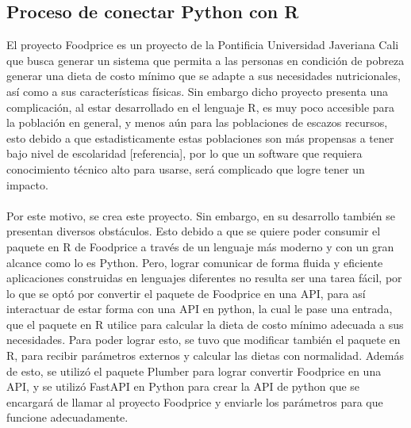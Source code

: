 \subsection{Proceso de conectar Python con R} 
\noindent El proyecto Foodprice es un proyecto de la Pontificia Universidad Javeriana Cali que busca generar un sistema que permita a las personas en condici\'on de pobreza generar una dieta de costo m\'inimo que se adapte a sus necesidades nutricionales, as\'i como a sus caracter\'isticas f\'isicas. Sin embargo dicho proyecto presenta una complicaci\'on, al estar desarrollado en el lenguaje R, es muy poco accesible para la poblaci\'on en general, y menos a\'un para las poblaciones de escazos recursos, esto debido a que estadisticamente estas poblaciones son m\'as propensas a tener bajo nivel de escolaridad [referencia], por lo que un software que requiera conocimiento t\'ecnico alto para usarse, ser\'a complicado que logre tener un impacto.
\\
\\
Por este motivo, se crea este proyecto. Sin embargo, en su desarrollo tambi\'en se presentan diversos obst\'aculos. Esto debido a que se quiere poder consumir el paquete en R de Foodprice a trav\'es de un lenguaje m\'as moderno y con un gran alcance como lo es Python. Pero, lograr comunicar de forma fluida y eficiente aplicaciones construidas en lenguajes diferentes no resulta ser una tarea f\'acil, por lo que se opt\'o por convertir el paquete de Foodprice en una API, para as\'i interactuar de estar forma con una API en python, la cual le pase una entrada, que el paquete en R utilice para calcular la dieta de costo m\'inimo adecuada a sus necesidades. Para poder lograr esto, se tuvo que modificar tambi\'en el paquete en R, para recibir par\'ametros externos y calcular las dietas con normalidad. Adem\'as de esto, se utiliz\'o el paquete Plumber para lograr convertir Foodprice en una API, y se utiliz\'o FastAPI en Python para crear la API de python que se encargar\'a de llamar al proyecto Foodprice y enviarle los par\'ametros para que funcione adecuadamente.





